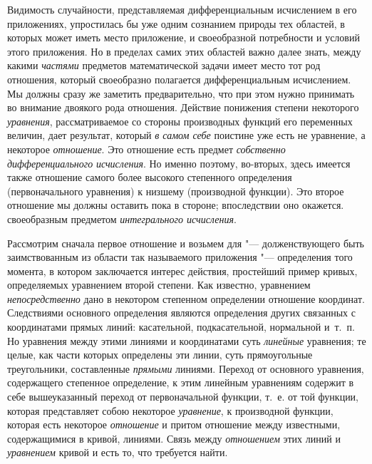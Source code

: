Видимость случайности, представляемая дифференциальным исчислением в его
приложениях, упростилась бы уже одним сознанием природы тех областей, в
которых может иметь место приложение, и своеобразной потребности и условий
этого приложения. Но в пределах самих этих областей важно далее знать,
между какими {\em частями} предметов математической
задачи имеет место тот род отношения, который своеобразно полагается
дифференциальным исчислением. Мы должны сразу же заметить предварительно,
что при этом нужно принимать во внимание двоякого рода отношения. Действие
понижения степени некоторого {\em уравнения},
рассматриваемое со стороны производных функций его переменных величин, дает
результат, который {\em в самом себе} поистине уже есть
не уравнение, а некоторое {\em отношение}. Это
отношение есть предмет {\em собственно
дифференциального} {\em исчисления}. Но именно поэтому,
во-вторых, здесь имеется также отношение самого более высокого степенного
определения (первоначального уравнения) к низшему (производной функции).
Это второе отношение мы должны оставить пока в стороне; впоследствии оно
окажется. своеобразным предметом {\em интегрального исчисления}.

Рассмотрим сначала первое отношение и возьмем для "--- долженствующего быть
заимствованным из области так называемого приложения "--- определения того
момента, в котором заключается интерес действия, простейший пример кривых,
определяемых уравнением второй степени. Как известно, уравнением
{\em непосредственно} дано в некотором степенном
определении отношение координат. Следствиями основного определения являются
определения других связанных с координатами прямых линий: касательной,
подкасательной, нормальной и~т.~п. Но уравнения между этими линиями и
координатами суть {\em линейные} уравнения; те целые,
как части которых определены эти линии, суть прямоугольные треугольники,
составленные {\em прямыми} линиями. Переход от
основного уравнения, содержащего степенное определение, к этим линейным
уравнениям содержит в себе вышеуказанный переход от первоначальной
функции, т.~е. от той функции, которая представляет собою некоторое
{\em уравнение}, к производной функции, которая есть
некоторое {\em отношение} и притом отношение между
известными, содержащимися в кривой, линиями. Связь между
{\em отношением} этих линий и
{\em уравнением} кривой и есть то, что требуется найти.

